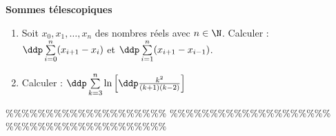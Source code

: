 



\begin{exercice} \; \textbf{Sommes t\'elescopiques}
\begin{enumerate}
\item Soit $x_0,x_1,\dots,x_n$ des nombres r\'eels avec $n\in\N$. Calculer : \; $\ddp \sum\limits_{i=0}^{n} (x_{i+1}-x_i) $ \; et \; $\ddp \sum\limits_{i=1}^{n} (x_{i+1}-x_{i-1})$.
\item Calculer : $\ddp \sum\limits_{k=3}^{n} \ln{\left\lbrack  \ddp\frac{k^2}{(k+1)(k-2)} \right\rbrack}$
\end{enumerate}
\end{exercice}


\%\%\%\%\%\%\%\%\%\%\%\%\%\%\%\%\%\%\%\%
\%\%\%\%\%\%\%\%\%\%\%\%\%\%\%\%\%\%\%\%
\%\%\%\%\%\%\%\%\%\%\%\%\%\%\%\%\%\%\%\%




